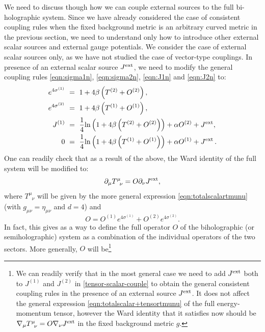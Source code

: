 \documentclass[prd,reprint,a4paper,showpacs,superscriptaddress,11pt,onecolumn,nofootinbib]{revtex4-1}
\renewcommand{\(}{\left(}
\renewcommand{\)}{\right)}
\newcommand{\6}{\partial}
\begin{document}
We need to discuss though how we can couple external sources to the full bi-holographic system. Since we have already considered the case of consistent coupling rules when the fixed background metric is an arbitrary curved metric in the previous section, we need to understand only how to introduce other external scalar sources and external gauge potentials. We consider the case of external scalar sources only, as we have not studied the case of vector-type couplings. In presence of an external scalar source $J^{\rm ext}$, we need to modify the general coupling rules \eqref{eqn:sigma1n},  \eqref{eqn:sigma2n},  \eqref{eqn:J1n} and  \eqref{eqn:J2n} to:
\begin{subequations}
\label{allequations}
\begin{align}
e^{4\sigma^{(1)}} ~ &= ~ 1 +4 \beta \left(T^{(2)} + O^{(2)}\right) ,\label{eqn:sigma1nn}\\
e^{4\sigma^{(2)}} ~ &= ~ 1+ 4 \beta  \left(T^{(1)} + O^{(1)}\right), \label{eqn:sigma2nn}\\
J^{(1)} ~ &= ~ \frac{1}{4}{\rm ln} \left(1 +4\beta\left(T^{(2)} + O^{(2)}\right)\right) + \alpha O^{(2)} + J^{\rm ext},\label{eqn:J1nn}\\
0~ &= ~ \frac{1}{4}{\rm ln} \left(1 + 4\beta\left(T^{(1)} + O^{(1)}\right)\right) + \alpha O^{(1)} + J^{\rm ext}\, . \label{eqn:J2nn}
\end{align}
\end{subequations}
One can readily check that as a result of the above, the Ward identity of the full system will be modified to:
\begin{equation}
\partial_\mu T^\mu_{\phantom{\mu}\nu} = O \partial_\nu J^{\rm ext},
\end{equation}
where $T^\mu_{\phantom{\mu}\nu}$ will be given by the more general expression \eqref{eqn:totalscalartmunu} (with $g_{\mu\nu} = \eta_{\mu\nu}$ and $d= 4$) and 
\begin{equation}
O = O^{(1)} e^{4\sigma^{(1)}} + O^{(2)} e^{4\sigma^{(2)}}.
\end{equation}
In fact, this gives as a way to define the full operator $O$ of the biholographic (or semiholographic) system as a combination of the individual operators of the two sectors. More generally, $O$ will be\footnote{We can readily verify that in the most general case we need to add $J^{\rm ext}$ both to $J^{(1)}$ and $J^{(2)}$ in \eqref{tensor-scalar-couple} to obtain the general consistent coupling rules   in the presence of an external source $J^{\rm ext}$. It does not affect the general expression \eqref{eqn:totalscalar+tensortmunu} of the full energy-momentum tensor, however the Ward identity that it satisfies now should be $\nabla_\mu T^\mu_{\phantom{\mu}\nu} = O \nabla_\nu J^{\rm ext}$ in the fixed background metric $g$.  } 
\end{document}
